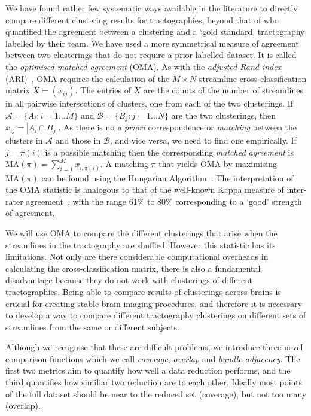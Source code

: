 \documentclass{bioinfo}
\begin{document}
\begin{methods}
We have found rather few systematic ways available in the literature to
directly compare different clustering results for tractographies, beyond
that of \citet{moberts2005evaluation} who quantified the agreement
between a clustering and a `gold standard' tractography labelled by
their team.  We have used a more symmetrical measure of agreement
between two clusterings that do not require a prior labelled dataset.
It is called the \emph{optimised matched agreement} (OMA). As with the
\emph{adjusted Rand index} (ARI)~\citep{moberts2005evaluation}, OMA requires
the calculation of the $M \times N$ streamline cross-classification
matrix $X=(x_{ij})$. The entries of $X$ are the counts of the number of streamlines in all
pairwise intersections of clusters, one from each of the two
clusterings.  If $\mathcal{A}=\{A_i:i=1\dots M\}$ and
$\mathcal{B}=\{B_j:j=1\ldots N\}$ are the two clusterings, then
$x_{ij}=|A_i \cap B_j|$. As there is no \emph{a priori} correspondence
or \emph{matching} between the clusters in $\mathcal{A}$ and those in
$\mathcal{B}$, and vice versa, we need to find one empirically. If
$j=\pi(i)$ is a possible matching then the corresponding \emph{matched
  agreement} is $\mathrm{MA}(\pi) = \sum_{i=1}^M x_{i,\pi(i)}$. A
matching $\pi$ that yields OMA by maximising $\mathrm{MA}(\pi)$ can be
found using the Hungarian Algorithm~\citep{Kuhn1955}. The interpretation
of the OMA statistic is analogous to that of the well-known Kappa
measure of inter-rater agreement~\citep{altman1995}, with the range 61\%
to 80\% corresponding to a `good' strength of agreement.

We will use OMA to compare the different clusterings that arise when the
streamlines in the tractography are shuffled. However this statistic has
its limitations. Not only are there considerable computational overheads
in calculating the cross-classification matrix, there is also a
fundamental disadvantage because they do not work with clusterings of
different tractographies. Being able to compare results of clusterings
across brains is crucial for creating stable brain imaging procedures,
and therefore it is necessary to develop a way to compare different
tractography clusterings on different sets of streamlines from the same
or different subjects.

Although we recognise that these are difficult problems, we introduce
three novel comparison functions which we call \emph{coverage},
\emph{overlap} and \emph{bundle adjacency}. The first two metrics aim to
quantify how well a data reduction performs, and the third quantifies
how similiar two reduction are to each other. Ideally most points of the
full dataset should be near to the reduced set (coverage), but not too
many (overlap).


\end{methods}
\end{document}
